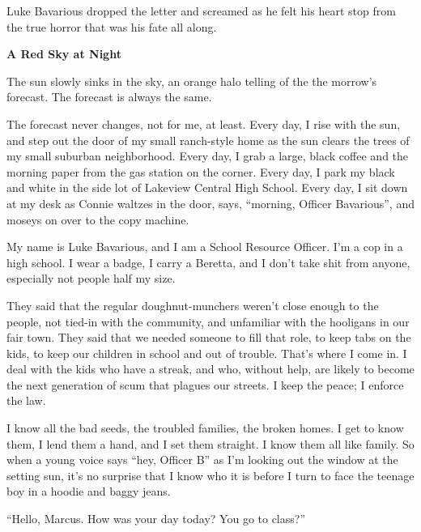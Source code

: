 Luke Bavarious dropped the letter and screamed as he felt his heart
stop from the true horror that was his fate all along. 

 





{\bf A Red Sky at Night}



The sun slowly sinks in the sky, an orange halo telling of the the
morrow's forecast. The forecast is always the same.



The forecast never changes, not for me, at least. Every day, I rise
with the sun, and step out the door of my small ranch-style home as
the sun clears the trees of my small suburban neighborhood. Every
day, I grab a large, black coffee and the morning paper from the
gas station on the corner. Every day, I park my black and white in
the side lot of Lakeview Central High School. Every day, I sit down
at my desk as Connie waltzes in the door, says, ``morning, Officer
Bavarious'', and moseys on over to the copy machine.



My name is Luke Bavarious, and I am a School Resource Officer. I'm
a cop in a high school. I wear a badge, I carry a Beretta, and I
don't take shit from anyone, especially not people half my
size.



They said that the regular doughnut-munchers weren't close enough
to the people, not tied-in with the community, and unfamiliar with
the hooligans in our fair town. They said that we needed someone to
fill that role, to keep tabs on the kids, to keep our children in
school and out of trouble. That's where I come in. I deal with the
kids who have a streak, and who, without help, are likely to become
the next generation of scum that plagues our streets. I keep the
peace; I enforce the law.



I know all the bad seeds, the troubled families, the broken homes.
I get to know them, I lend them a hand, and I set them straight. I
know them all like family. So when a young voice says ``hey, Officer
B'' as I'm looking out the window at the setting sun, it's no
surprise that I know who it is before I turn to face the teenage
boy in a hoodie and baggy jeans.



``Hello, Marcus. How was your day today? You go to class?''


